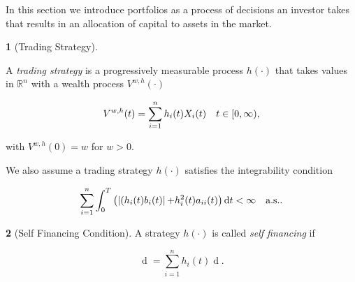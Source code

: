 \documentclass[british]{amsart} \usepackage{lmodern}
\numberwithin{equation}{section} \numberwithin{figure}{section}
\theoremstyle{plain} \newtheorem{thm}{\protect\theoremname}[section]
\theoremstyle{definition} \newtheorem{defn}[thm]{\protect\definitionname}
\theoremstyle{plain} \newtheorem{assumption}[thm]{\protect\assumptionname}
\theoremstyle{plain} \newtheorem{lem}[thm]{\protect\lemmaname}
\theoremstyle{plain} \newtheorem{prop}[thm]{\protect\propositionname}
\theoremstyle{remark} \newtheorem{rem}[thm]{\protect\remarkname}
\theoremstyle{plain} \newtheorem{cor}[thm]{\protect\corollaryname}
\renewcommand{\d}[1]{\mathop{\mathrm{d}{#1}}}
\newcommand{\abs}[1]{\mathop{|{#1}|}} \newcommand{\market}{\mathcal{M}}
\begin{document}
In this section we introduce portfolios as a process of decisions an investor
takes that results in an allocation of capital to assets in the market.

\begin{defn} [Trading Strategy]
  \label{def:tradingstrategy}

  A \textit{trading strategy} is a progressively measurable process $h(\cdot)$
  that takes values in $\mathbb{R}^{n}$ with a wealth process $V^{w,h}(\cdot)$ 

  \begin{equation*}
    V^{w,h}(t) = \sum_{i=1}^{n} h_{i}(t) X_{i}(t) 
    \quad t\in[0,\infty),
  \end{equation*}

  with $V^{w,h}(0)=w$ for $w > 0$. 

  We also assume a trading strategy $h(\cdot)$ satisfies the integrability condition

  \begin{equation*}
    \sum_{i=1}^{n} \int_{0}^{T} 
    \left(
    \abs{(h_{i}(t)b_{i}(t)} + h_{i}^2(t)a_{ii}(t)
      \right) \d{t} < \infty
    \quad \almostsurely.
  \end{equation*}

\end{defn}

\begin{defn} [Self Financing Condition]
  \label{def:selffinancingcondition}  
  A strategy $h(\cdot)$ is called \textit{self financing} if 

  \begin{equation}
    \d{V^{w,h}(t)} = \sum_{i=1}^{n} h_{i}(t) \d{X_{i}(t)}.
  \end{equation}


\end{defn}
\end{document}
